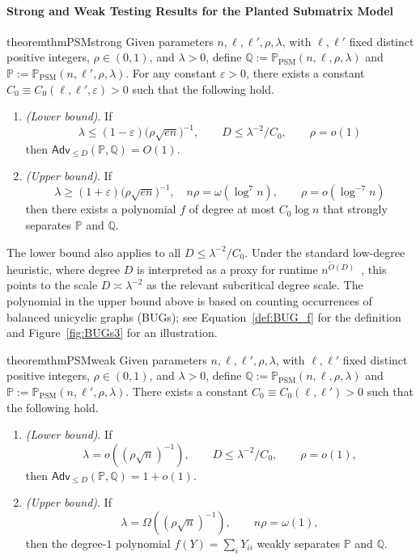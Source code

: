 \documentclass[11pt, letterpaper]{article}
\numberwithin{equation}{section}
\newcommand{\Adv}{\mathsf{Adv}}
\newcommand{\PP}{\mathbb{P}}
\newcommand{\QQ}{\mathbb{Q}}
\begin{document}
\paragraph*{Strong and Weak Testing Results for the Planted Submatrix Model}\begin{restatable}{theorem}{thmPSMstrong}
\label{thm:strong_PSM}
Given parameters $n,\ell,\ell',\rho,\lambda$, with 
$\ell,\ell'$ fixed distinct positive integers, $\rho\in(0,1)$, and
$\lambda>0$, define
$\QQ:=\mathbb{P}_{\mathrm{PSM}}(n,\ell,\rho,\lambda)$ and
$\PP:=\mathbb{P}_{\mathrm{PSM}}(n,\ell',\rho,\lambda)$. For any constant $\varepsilon>0$, there exists a constant $C_0\equiv C_0(\ell,\ell',\varepsilon)>0$ such that the following hold. 
\begin{enumerate}
  \item[(i)] \emph{(Lower bound)}. If 
  $$\lambda \leq (1-\varepsilon)\Big(\rho\sqrt{en}\Big)^{-1}, \qquad D\leq \lambda^{-2}/C_0, \qquad \rho=o(1)$$
  then
  $\Adv_{\leq D}(\PP,\QQ)=O(1).$

  \item[(ii)] \emph{(Upper bound)}. If 
  $$\lambda \geq (1+\varepsilon)\Big(\rho\sqrt{en}\Big)^{-1}, \quad \!\!\! n\rho=\omega(\log^7n), \qquad\!\!\!
\rho=o(\log^{-7}n)
  $$ then there exists a polynomial $f$ of degree at most $C_0\log n$ that strongly separates $\PP$ and $\QQ$.
\end{enumerate}
\end{restatable}
The lower bound also applies to all $D \le \lambda^{-2}/C_0$. Under the standard low-degree heuristic, where degree $D$ is interpreted as a proxy for runtime $n^{\widetilde O(D)}$~\cite{HS-bayesian}, this points to the scale $D\asymp \lambda^{-2}$ as the relevant subcritical degree scale. The polynomial in the upper bound above is based on counting occurrences of balanced unicyclic graphs (BUGs); see Equation~\eqref{def:BUG_f} for the definition and Figure~\ref{fig:BUGs3} for an illustration.
\begin{restatable}
{theorem}{thmPSMweak}\label{thm:weak_PSM}
Given parameters $n,\ell,\ell',\rho,\lambda$, with 
$\ell,\ell'$ fixed distinct positive integers, $\rho\in(0,1)$, and
$\lambda>0$, define
$\QQ:=\mathbb{P}_{\mathrm{PSM}}(n,\ell,\rho,\lambda)$ and
$\PP:=\mathbb{P}_{\mathrm{PSM}}(n,\ell',\rho,\lambda)$. There exists a constant $C_0 \equiv C_0(\ell,\ell')>0$ such that the following hold.
\begin{enumerate}
  \item[(i)] \emph{(Lower bound)}. If
  $$\lambda = o \left(({\rho\sqrt{n}})^{-1}\right), \qquad D\leq \lambda^{-2}/C_0, \qquad \rho=o(1),$$
  then
  $\Adv_{\leq D}(\PP,\QQ)=1+o(1).
  $

  \item[(ii)] \emph{(Upper bound)}. If  
  $$\lambda =\Omega\left(({\rho\sqrt{n}})^{-1}\right), \qquad   n\rho =\omega(1),$$
  then the degree-$1$ polynomial $f(Y)=\sum_i Y_{ii}$ weakly separates $\mathbb{P}$ and $\mathbb{Q}$.
\end{enumerate}
\end{restatable}
\end{document}
